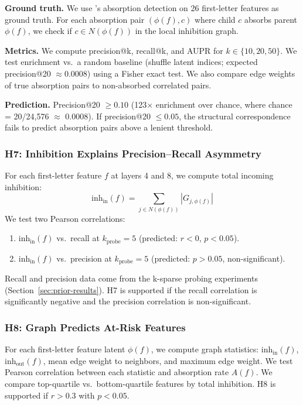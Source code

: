 \documentclass{article}
\begin{document}
\textbf{Ground truth.} We use \citet{chanin2024quantifying}'s absorption detection on 26 first-letter features as ground truth. For each absorption pair $(\phi(f), c)$ where child $c$ absorbs parent $\phi(f)$, we check if $c \in N(\phi(f))$ in the local inhibition graph.

\textbf{Metrics.} We compute precision@k, recall@k, and AUPR for $k \in \{10, 20, 50\}$. We test enrichment vs.\ a random baseline (shuffle latent indices; expected precision@20 $\approx 0.0008$) using a Fisher exact test. We also compare edge weights of true absorption pairs to non-absorbed correlated pairs.

\textbf{Prediction.} Precision@20 $\geq 0.10$ (123$\times$ enrichment over chance, where chance = 20/24,576 $\approx$ 0.0008). If precision@20 $\leq 0.05$, the structural correspondence fails to predict absorption pairs above a lenient threshold.

\subsubsection{H7: Inhibition Explains Precision--Recall Asymmetry}

For each first-letter feature $f$ at layers 4 and 8, we compute total incoming inhibition:
\begin{equation}
\text{inh}_{\text{in}}(f) = \sum_{j \in N(\phi(f))} |G_{j, \phi(f)}|
\end{equation}
We test two Pearson correlations:
\begin{enumerate}
    \item $\text{inh}_{\text{in}}(f)$ vs.\ recall at $k_{\text{probe}} = 5$ (predicted: $r < 0$, $p < 0.05$).
    \item $\text{inh}_{\text{in}}(f)$ vs.\ precision at $k_{\text{probe}} = 5$ (predicted: $p > 0.05$, non-significant).
\end{enumerate}
Recall and precision data come from the k-sparse probing experiments (Section~\ref{sec:prior-results}). H7 is supported if the recall correlation is significantly negative and the precision correlation is non-significant.

\subsubsection{H8: Graph Predicts At-Risk Features}

For each first-letter feature latent $\phi(f)$, we compute graph statistics: $\text{inh}_{\text{in}}(f)$, $\text{inh}_{\text{out}}(f)$, mean edge weight to neighbors, and maximum edge weight. We test Pearson correlation between each statistic and absorption rate $A(f)$. We compare top-quartile vs.\ bottom-quartile features by total inhibition. H8 is supported if $r > 0.3$ with $p < 0.05$.
\end{document}
